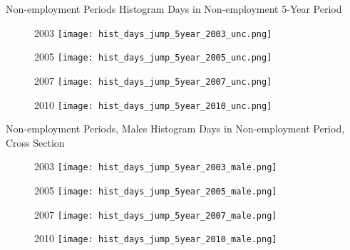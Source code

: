 \documentclass[hyperref={bookmarks=false}]{beamer}
\begin{document}
\begin{appendix}
\begin{frame}{Non-employment Periods}
Histogram Days in Non-employment 5-Year Period
\begin{figure}[!t]
\centering
\begin{minipage}[b]{0.30\textwidth}{2003}
\centering
\texttt{[image: hist\_days\_jump\_5year\_2003\_unc.png]}
\end{minipage}
\begin{minipage}[b]{0.30\textwidth}{2005}
\centering
\texttt{[image: hist\_days\_jump\_5year\_2005\_unc.png]}
\end{minipage}
\begin{minipage}[b]{0.30\textwidth}{2007}
\centering
\texttt{[image: hist\_days\_jump\_5year\_2007\_unc.png]}
\end{minipage}
\begin{minipage}[b]{0.30\textwidth}{2010}
\centering
\texttt{[image: hist\_days\_jump\_5year\_2010\_unc.png]}
\end{minipage}
\end{figure}
\end{frame}

\begin{frame}{Non-employment Periods, Males}
Histogram Days in Non-employment Period, Cross Section
\begin{figure}[!t]
\centering
\begin{minipage}[b]{0.30\textwidth}{2003}
\centering
\texttt{[image: hist\_days\_jump\_5year\_2003\_male.png]}
\end{minipage}
\begin{minipage}[b]{0.30\textwidth}{2005}
\centering
\texttt{[image: hist\_days\_jump\_5year\_2005\_male.png]}
\end{minipage}
\begin{minipage}[b]{0.30\textwidth}{2007}
\centering
\texttt{[image: hist\_days\_jump\_5year\_2007\_male.png]}
\end{minipage}
\begin{minipage}[b]{0.30\textwidth}{2010}
\centering
\texttt{[image: hist\_days\_jump\_5year\_2010\_male.png]}
\end{minipage}
\end{figure}
\end{frame}


\end{appendix}
\end{document}
